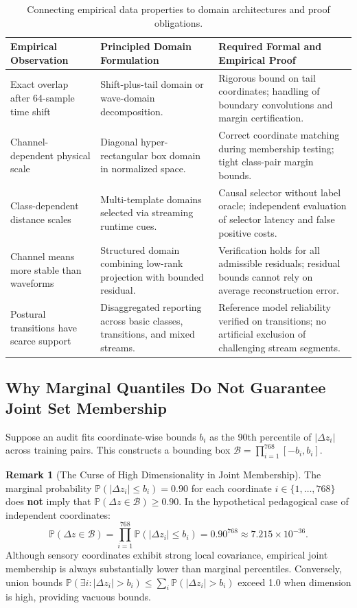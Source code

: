 \documentclass[11pt,a4paper]{article}
\theoremstyle{definition}
\newtheorem{remark}[proposition]{Remark}
\begin{document}
\begin{table}[htbp]\centering\small
\begin{tabularx}{\linewidth}{@{}P{3.2cm}Y Y@{}}\toprule
Empirical Observation & Principled Domain Formulation & Required Formal and Empirical Proof\\\midrule
Exact overlap after 64-sample time shift & Shift-plus-tail domain or wave-domain decomposition. & Rigorous bound on tail coordinates; handling of boundary convolutions and margin certification.\\
Channel-dependent physical scale & Diagonal hyper-rectangular box domain in normalized space. & Correct coordinate matching during membership testing; tight class-pair margin bounds.\\
Class-dependent distance scales & Multi-template domains selected via streaming runtime cues. & Causal selector without label oracle; independent evaluation of selector latency and false positive costs.\\
Channel means more stable than waveforms & Structured domain combining low-rank projection with bounded residual. & Verification holds for all admissible residuals; residual bounds cannot rely on average reconstruction error.\\
Postural transitions have scarce support & Disaggregated reporting across basic classes, transitions, and mixed streams. & Reference model reliability verified on transitions; no artificial exclusion of challenging stream segments.\\\bottomrule
\end{tabularx}
\caption{Connecting empirical data properties to domain architectures and proof obligations.}
\end{table}

\subsection{Why Marginal Quantiles Do Not Guarantee Joint Set Membership}
Suppose an audit fits coordinate-wise bounds $b_i$ as the 90th percentile of $|\Delta z_i|$ across training pairs. This constructs a bounding box $\mathcal{B} = \prod_{i=1}^{768} [-b_i, b_i]$.

\begin{remark}[The Curse of High Dimensionality in Joint Membership]
The marginal probability $\mathbb{P}(|\Delta z_i| \le b_i) = 0.90$ for each coordinate $i \in \{1, \ldots, 768\}$ does \textbf{not} imply that $\mathbb{P}(\Delta z \in \mathcal{B}) \ge 0.90$. In the hypothetical pedagogical case of independent coordinates:
\begin{equation}
\mathbb{P}(\Delta z \in \mathcal{B}) = \prod_{i=1}^{768} \mathbb{P}(|\Delta z_i| \le b_i) = 0.90^{768} \approx 7.215 \times 10^{-36}.
\end{equation}
Although sensory coordinates exhibit strong local covariance, empirical joint membership is always substantially lower than marginal percentiles. Conversely, union bounds $\mathbb{P}(\exists i : |\Delta z_i| > b_i) \le \sum_i \mathbb{P}(|\Delta z_i| > b_i)$ exceed 1.0 when dimension is high, providing vacuous bounds.
\end{remark}
\end{document}
